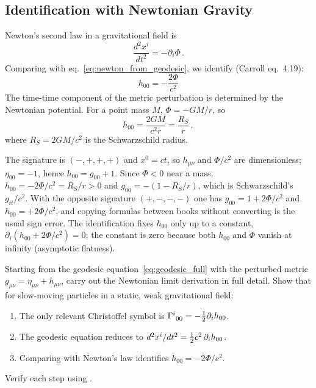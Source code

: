 \subsection{Identification with Newtonian Gravity}

Newton's second law in a gravitational field is
\begin{equation}
    \frac{d^2 x^i}{dt^2} = -\partial_i \Phi \,.
    \label{eq:newton_law}
\end{equation}
Comparing with eq.~\eqref{eq:newton_from_geodesic}, we identify
(Carroll eq.~4.19):
\begin{equation}
    \boxed{
    h_{00} = -\frac{2\Phi}{c^2}
    }
    \label{eq:h00_identification}
\end{equation}
The time-time component of the metric perturbation is determined by the
Newtonian potential.  For a point mass $M$, $\Phi = -GM/r$, so
\begin{equation}
    h_{00} = \frac{2GM}{c^2 r} = \frac{R_S}{r} \,,
    \label{eq:h00_point_mass}
\end{equation}
where $R_S = 2GM/c^2$ is the Schwarzschild radius.

\begin{annotation}
The signature is $(-,+,+,+)$ and $x^0 = ct$, so $h_{\mu\nu}$ and
$\Phi/c^2$ are dimensionless; $\eta_{00} = -1$, hence
$h_{00} = g_{00} + 1$.
Since $\Phi < 0$ near a mass, $h_{00} = -2\Phi/c^2 = R_S/r > 0$ and
$g_{00} = -(1 - R_S/r)$, which is Schwarzschild's $g_{tt}/c^2$.
With the opposite signature $(+,-,-,-)$ one has
$g_{00} = 1 + 2\Phi/c^2$ and $h_{00} = +2\Phi/c^2$, and copying
formulas between books without converting is the usual
sign error.
The identification fixes $h_{00}$ only up to a constant,
$\partial_i(h_{00} + 2\Phi/c^2) = 0$; the constant is zero because
both $h_{00}$ and $\Phi$ vanish at infinity (asymptotic
flatness).
\end{annotation}


\begin{exercise}
\label{ex:newtonian_limit}
Starting from the geodesic equation~\eqref{eq:geodesic_full} with the
perturbed metric $g_{\mu\nu} = \eta_{\mu\nu} + h_{\mu\nu}$, carry out
the Newtonian limit derivation in full detail.  Show that for
slow-moving particles in a static, weak gravitational field:
\begin{enumerate}[label=(\alph*)]
    \item The only relevant Christoffel symbol is
          $\Gamma^{i}_{\ 0 0} = -\tfrac{1}{2} \partial_i h_{00}$.
    \item The geodesic equation reduces to
          $d^2 x^i / dt^2 = \tfrac{1}{2} c^2\, \partial_i h_{00}$.
    \item Comparing with Newton's law identifies
          $h_{00} = -2\Phi/c^2$.
\end{enumerate}
Verify each step using
.
\end{exercise}


